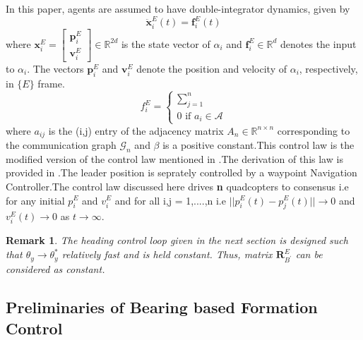 \documentclass[letterpaper, 10 pt, conference]{ieeeconf}
\newtheorem{rem}{Remark}
\begin{document}
In this paper, agents are assumed to have double-integrator dynamics, given by
\begin{equation}
    \ddot{\mathbf{x}}_i^E(t)=\mathbf{f}_i^E(t)\label{eq:agent}
\end{equation}
\noindent where $\mathbf{x}_i^E=\begin{bmatrix}\mathbf{p}^E_i\\\mathbf{v}^E_i\end{bmatrix}\in\mathbb{R}^{2d}$ is the state vector of $\alpha_i$ and $\mathbf{f}^E_i\in\mathbb{R}^d$ denotes the input to $\alpha_i$. The vectors $\mathbf{p}^E_i$ and $\mathbf{v}^E_i$ denote the position and velocity of $\alpha_i$, respectively, in $\{E\}$ frame.
\begin{equation}
    f_{i}^{E}=\left\{\begin{array}{l}
        \sum_{j = 1}^{n} %
        \\
        0 \text { if }  a_{i} \in \mathcal{A}
    \end{array}\right.
\end{equation}
where $a_{ij}$ is the (i,j) entry of the adjacency matrix $A_{n} \in \mathbb{R}^{n \times n}$ corresponding to the communication graph $\mathcal{G}_{n}$ and $\beta$ is a positive constant.This control law is the modified version of the control law mentioned in \cite{Distributed_Consensus_book}.The derivation of this law is provided in \cite{implementation_of_distributed_consensus}.The leader position is seprately controlled by a waypoint Navigation Controller.The control law discussed here drives \textbf{n} quadcopters to consensus i.e for any initial $p_{i}^{E}$ and $v_{i}^{E}$ and for all i,j = 1,....,n i.e $||p_{i}^{E}(t)-p_{j}^{E}(t)||\rightarrow0$ and $v_{i}^{E}(t)\rightarrow0$ as $t\rightarrow \infty$.

\begin{rem}
    The heading control loop given in the next section is designed such that $\theta_{y} \rightarrow \theta_{y}^{*}$ relatively fast and is held constant. Thus, matrix $\mathbf{R}_{B^{\prime}}^{E}$ can be considered as constant.
\end{rem}

\subsection{Preliminaries of Bearing based Formation Control}
\end{document}
